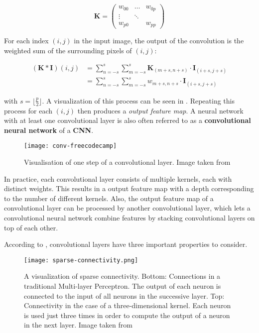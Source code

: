 \begin{equation}
    \label{eq:kernel_definition}
    \bm{K} =
    \begin{pmatrix}
        w_{00} & \dots  & w_{0p} \\
        \vdots & \ddots & \\
        w_{p0} &        & w_{pp}
    \end{pmatrix}
\end{equation}

For each index $(i,j)$ in the input image, the output of the convolution is the weighted sum of the surrounding pixels of $(i,j)$:

\begin{equation}
    \begin{split}
        (\bm{K} * \bm{I})(i,j)
        &= \sum_{n=-s}^s \sum_{m=-s}^s \bm{K}_{(m+s, n+s)} \cdot \bm{I}_{(i+s, j+s)} \\
        &= \sum_{n=-s}^s \sum_{m=-s}^s w_{m+s, n+s} \cdot \bm{I}_{(i+s, j+s)}
    \end{split}
\end{equation}

with $s = \lfloor \frac{p}{2} \rfloor$.
A visualization of this process can be seen in .
Repeating this process for each $(i,j)$ then produces a \textit{output feature map}.
A neural network with at least one convolutional layer is also often referred to as a \textbf{convolutional neural network} of a \textbf{CNN}.

\begin{figure}[htb!]
    \centering
    \texttt{[image: conv-freecodecamp]}
    \caption{Visualisation of one step of a convolutional layer. Image taken from \cite{dertat_applied_2017}}
    \label{fig:conv-vis}
\end{figure}

In practice, each convolutional layer consists of multiple kernels, each with distinct weights.
This results in a output feature map with a depth corresponding to the number of different kernels.
Also, the output feature map of a convolutional layer can be processed by another convolutional layer, which lets a convolutional neural network combine features by stacking convolutional layers on top of each other.

According to \cite{goodfellow_deep_2016}, convolutional layers have three important properties to consider.

\begin{figure}[htb!]
    \centering
    \texttt{[image: sparse-connectivity.png]}
    \caption{A visualization of sparse connectivity. Bottom: Connections in a traditional Multi-layer Perceptron. The output of each neuron is connected to the input of all neurons in the successive layer. Top: Connectivity in the case of a three-dimensional kernel. Each neuron is used just three times in order to compute the output of a neuron in the next layer. Image taken from \cite{goodfellow_deep_2016}}
    \label{fig:sparse-connectivity}
\end{figure}

